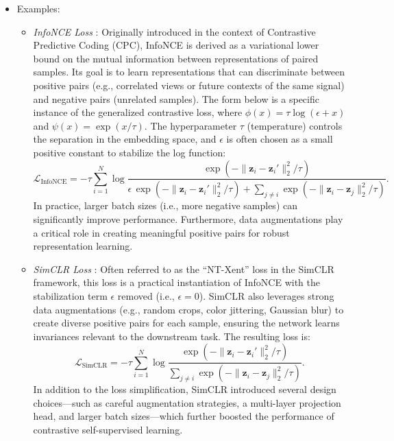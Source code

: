 \begin{itemize}
\begin{itemize}
        \item Examples:
        \begin{itemize}
            \item \emph{InfoNCE Loss} \citep{oord2018representation}: Originally introduced in the context of Contrastive Predictive Coding (CPC), InfoNCE is derived as a variational lower bound on the mutual information between representations of paired samples. Its goal is to learn representations that can discriminate between positive pairs (e.g., correlated views or future contexts of the same signal) and negative pairs (unrelated samples). The form below is a specific instance of the generalized contrastive loss, where \(\phi(x) = \tau \log(\epsilon + x)\) and \(\psi(x) = \exp(x / \tau)\). The hyperparameter \(\tau\) (temperature) controls the separation in the embedding space, and \(\epsilon\) is often chosen as a small positive constant to stabilize the log function:
              \[
                \mathcal{L}_{\text{InfoNCE}} 
                = -\tau \sum_{i=1}^{N} \log 
                \frac{\exp\left(-\|\mathbf{z}_i - \mathbf{z}_i'\|_2^2 / \tau\right)}
                {\epsilon \,\exp\left(-\|\mathbf{z}_i - \mathbf{z}_i'\|_2^2 / \tau\right) 
                + \sum_{j \neq i} \exp\left(-\|\mathbf{z}_i - \mathbf{z}_j\|_2^2 / \tau\right)}.
              \]
              In practice, larger batch sizes (i.e., more negative samples) can significantly improve performance. Furthermore, data augmentations play a critical role in creating meaningful positive pairs for robust representation learning.
        
            \item \emph{SimCLR Loss} \citep{chen2020simple}: Often referred to as the “NT-Xent” loss in the SimCLR framework, this loss is a practical instantiation of InfoNCE with the stabilization term \(\epsilon\) removed (i.e., \(\epsilon = 0\)). SimCLR also leverages strong data augmentations (e.g., random crops, color jittering, Gaussian blur) to create diverse positive pairs for each sample, ensuring the network learns invariances relevant to the downstream task. The resulting loss is:
              \[
                \mathcal{L}_{\text{SimCLR}} 
                = -\tau \sum_{i=1}^{N} \log 
                \frac{\exp\left(-\|\mathbf{z}_i - \mathbf{z}_i'\|_2^2 / \tau\right)}
                {\sum_{j \neq i} \exp\left(-\|\mathbf{z}_i - \mathbf{z}_j\|_2^2 / \tau\right)}.
              \]
              In addition to the loss simplification, SimCLR introduced several design choices—such as careful augmentation strategies, a multi-layer projection head, and larger batch sizes—which further boosted the performance of contrastive self-supervised learning.
        

\end{itemize}
\end{itemize}
\end{itemize}

